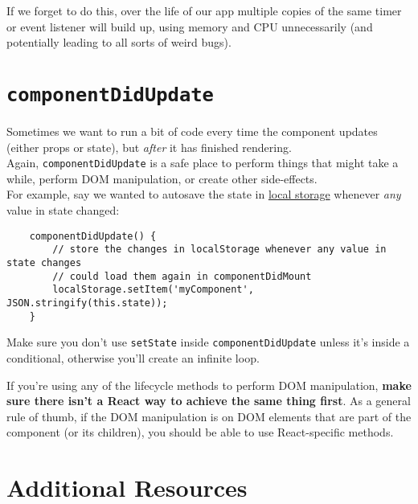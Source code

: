 If we forget to do this, over the life of our app multiple copies of the same timer or event listener will build up, using memory and CPU unnecessarily (and potentially leading to all sorts of weird bugs).


\section{\texttt{componentDidUpdate}}

Sometimes we want to run a bit of code every time the component updates (either props or state), but \textit{after} it has finished rendering.
\\

Again, \texttt{componentDidUpdate} is a safe place to perform things that might take a while, perform DOM manipulation, or create other side-effects.
\\

For example, say we wanted to autosave the state in \href{https://developer.mozilla.org/en-US/docs/Web/API/Window/localStorage}{local storage} whenever \textit{any} value in state changed:

\begin{verbatim}
    componentDidUpdate() {
        // store the changes in localStorage whenever any value in state changes
        // could load them again in componentDidMount
        localStorage.setItem('myComponent', JSON.stringify(this.state));
    }
\end{verbatim}

Make sure you don't use \texttt{setState} inside \texttt{componentDidUpdate} unless it's inside a conditional, otherwise you'll create an infinite loop.

\hr

If you're  using any of the lifecycle methods to perform DOM manipulation, \textbf{make sure there isn't a React way to achieve the same thing first}. As a general rule of thumb, if the DOM manipulation is on DOM elements that are part of the component (or its children), you should be able to use React-specific methods.



\section{Additional Resources}

